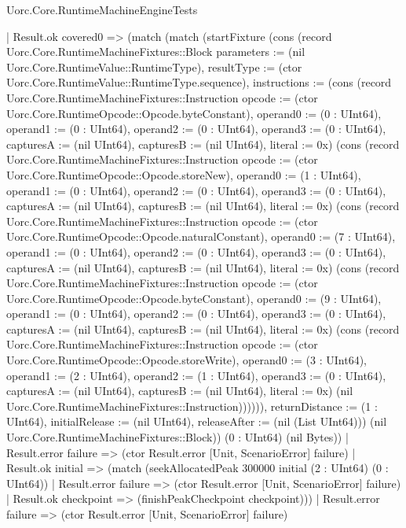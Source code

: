 \begin{lexlean}{Uorc.Core.RuntimeMachineEngineTests}
\begin{semanticmodule}
{    | Result.ok covered0 => (match (match (startFixture (cons (record Uorc.Core.RuntimeMachineFixtures::Block {parameters := (nil Uorc.Core.RuntimeValue::RuntimeType), resultType := (ctor Uorc.Core.RuntimeValue::RuntimeType.sequence), instructions := (cons (record Uorc.Core.RuntimeMachineFixtures::Instruction {opcode := (ctor Uorc.Core.RuntimeOpcode::Opcode.byteConstant), operand0 := (0 : UInt64), operand1 := (0 : UInt64), operand2 := (0 : UInt64), operand3 := (0 : UInt64), capturesA := (nil UInt64), capturesB := (nil UInt64), literal := 0x}) (cons (record Uorc.Core.RuntimeMachineFixtures::Instruction {opcode := (ctor Uorc.Core.RuntimeOpcode::Opcode.storeNew), operand0 := (1 : UInt64), operand1 := (0 : UInt64), operand2 := (0 : UInt64), operand3 := (0 : UInt64), capturesA := (nil UInt64), capturesB := (nil UInt64), literal := 0x}) (cons (record Uorc.Core.RuntimeMachineFixtures::Instruction {opcode := (ctor Uorc.Core.RuntimeOpcode::Opcode.naturalConstant), operand0 := (7 : UInt64), operand1 := (0 : UInt64), operand2 := (0 : UInt64), operand3 := (0 : UInt64), capturesA := (nil UInt64), capturesB := (nil UInt64), literal := 0x}) (cons (record Uorc.Core.RuntimeMachineFixtures::Instruction {opcode := (ctor Uorc.Core.RuntimeOpcode::Opcode.byteConstant), operand0 := (9 : UInt64), operand1 := (0 : UInt64), operand2 := (0 : UInt64), operand3 := (0 : UInt64), capturesA := (nil UInt64), capturesB := (nil UInt64), literal := 0x}) (cons (record Uorc.Core.RuntimeMachineFixtures::Instruction {opcode := (ctor Uorc.Core.RuntimeOpcode::Opcode.storeWrite), operand0 := (3 : UInt64), operand1 := (2 : UInt64), operand2 := (1 : UInt64), operand3 := (0 : UInt64), capturesA := (nil UInt64), capturesB := (nil UInt64), literal := 0x}) (nil Uorc.Core.RuntimeMachineFixtures::Instruction)))))), returnDistance := (1 : UInt64), initialRelease := (nil UInt64), releaseAfter := (nil (List UInt64))}) (nil Uorc.Core.RuntimeMachineFixtures::Block)) (0 : UInt64) (nil Bytes))
        | Result.error failure => (ctor Result.error [Unit, ScenarioError] failure)
        | Result.ok initial => (match (seekAllocatedPeak 300000 initial (2 : UInt64) (0 : UInt64))
          | Result.error failure => (ctor Result.error [Unit, ScenarioError] failure)
          | Result.ok checkpoint => (finishPeakCheckpoint checkpoint)))
      | Result.error failure => (ctor Result.error [Unit, ScenarioError] failure)
}
\end{semanticmodule}
\end{lexlean}
